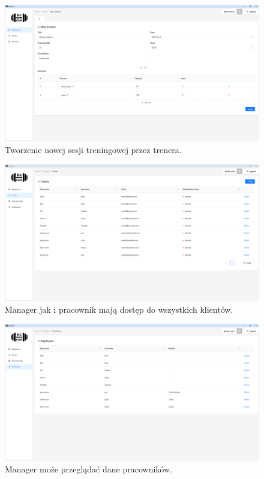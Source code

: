 \documentclass[../../spr.tex]{subfiles}
\begin{document}
\begin{figure}[H]
  \centering
  \includegraphics[width=\textwidth]{img/new_session.png}
  \caption{Tworzenie nowej sesji treningowej przez trenera.}
\end{figure}

\begin{figure}[H]
  \centering
  \includegraphics[width=\textwidth]{img/manager_clients.png}
  \caption{Manager jak i pracownik mają dostęp do wszystkich klientów.}
\end{figure}

\begin{figure}[H]
  \centering
  \includegraphics[width=\textwidth]{img/manager.png}
  \caption{Manager może przeglądać dane pracowników.}
\end{figure}
\end{document}
